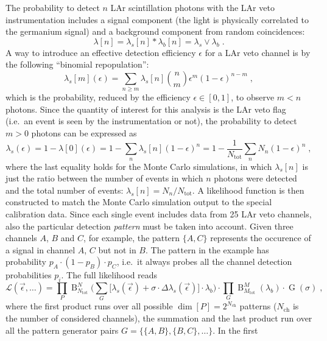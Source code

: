 The probability to detect $n$ LAr scintillation photons with the LAr veto instrumentation
includes a signal component (the light is physically correlated to the germanium signal)
and a background component from random coincidences:
\[
  \lambda[n] = \lambda_s[n] * \lambda_b[n] = \lambda_s \vee \lambda_b \;.
\]
A way to introduce an effective detection efficiency $\epsilon$ for a LAr veto channel is
by the following ``binomial repopulation'':
\[
  \lambda_s[m](\epsilon) = \sum_{n \geq m} \lambda_s[n] \binom{n}{m} \epsilon^m
    {(1-\epsilon)}^{n-m} \;,
\]
which is the probability, reduced by the efficiency $\epsilon \in [0,1]$, to observe $m <
n$ photons. Since the quantity of interest for this analysis is the LAr veto flag (i.e.~an
event is seen by the instrumentation or not), the probability to detect $m > 0$ photons
can be expressed as
\[
  \lambda_s(\epsilon) = 1 - \lambda[0](\epsilon)
                      = 1 - \sum_n \lambda_s[n] {(1-\epsilon)}^n
                      = 1 - \frac{1}{N_\text{tot}} \sum_n N_n {(1-\epsilon)}^n \;,
\]
where the last equality holds for the Monte Carlo simulations, in which $\lambda_s[n]$ is
just the ratio between the number of events in which $n$ photons were detected and the
total number of events: $\lambda_s[n] = N_n / N_\text{tot}$.
\newpar
A likelihood function is then constructed to match the Monte Carlo simulation output to the
special calibration data. Since each single event includes data from 25 LAr veto channels,
also the particular detection \emph{pattern} must be taken into account. Given three channels
$A$, $B$ and $C$, for example, the pattern $\{A,C\}$ represents the occurence of a signal
in channel $A$, $C$ but not in $B$. The pattern in the example has probability $p_A
\cdot (1-p_B) \cdot p_C$, i.e.~it always probes all the channel detection probabilities
$p_i$. The full likelihood reads
\begin{equation}\label{eq:bkg:lar:ph2:pca-likelihood}
  \mathcal{L}(\vec{\epsilon}, \ldots) =
    \prod_P \operatorname{B}_{N_\text{tot}}^N \Big(
      \sum_G \big[ \lambda_s(\vec{\epsilon}) + \sigma \cdot
      \Delta\lambda_s(\vec{\epsilon})\big] \cdot \lambda_b 
    \Big)
    \cdot \prod_G \operatorname{B}_{M_\text{tot}}^M (\lambda_b) \cdot
    \operatorname{G}(\sigma) \;,
\end{equation}
where the first product runs over all possible $\dim{[P]} = 2^{N_\text{ch}}$ patterns
($N_\text{ch}$ is the number of considered channels), the summation and the last product
run over all the pattern generator pairs $G = \{\{A,B\},\{B,C\},\ldots\}$. In the first
